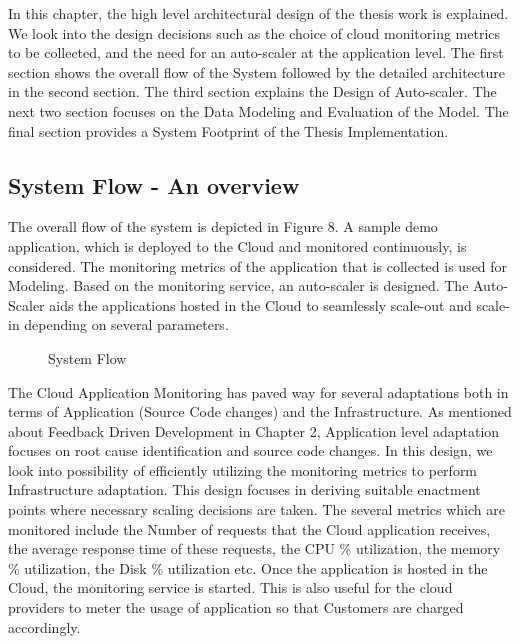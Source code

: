 \documentclass[article,type=msc,colorback,12pt,accentcolor=tud7b,table]{tudthesis}
\begin{document}
	In this chapter, the high level architectural design of the thesis work is explained. We look into the design decisions such as the choice of cloud monitoring metrics to be collected, and the need for an auto-scaler at the application level. The first section shows the overall flow of the System followed by the detailed architecture in the second section. The third section explains the Design of Auto-scaler. The next two section focuses on the Data Modeling and Evaluation of the Model. The final section provides a System Footprint of the Thesis Implementation.
 
\subsection{System Flow - An overview} 

	The overall flow of the system is depicted in Figure 8. A sample demo application, which is deployed to the Cloud and monitored continuously, is considered. The monitoring metrics of the application that is collected is used for Modeling. Based on the monitoring service, an auto-scaler is designed. The Auto-Scaler aids the applications hosted in the Cloud to seamlessly scale-out and scale-in depending on several parameters. 
	
		 \begin{figure}[!h]
		 	\begin{center}
		 		\makebox[\textwidth]{\texttt{[image: C1]}}
		 	\end{center}
		 	\caption{System Flow}
		 \end{figure}
		 
	
	The Cloud Application Monitoring has paved way for several adaptations both in terms of Application (Source Code changes) and the Infrastructure. As mentioned about Feedback Driven Development in Chapter 2, Application level adaptation focuses on root cause identification and source code changes. In this design, we look into possibility of efficiently utilizing the monitoring metrics to perform Infrastructure adaptation.  This design focuses in deriving suitable enactment points where necessary scaling decisions are taken. The several metrics which are monitored include the Number of requests that the Cloud application receives, the average response time of these requests, the CPU \% utilization, the memory \% utilization, the Disk \% utilization etc. Once the application is hosted in the Cloud, the monitoring service is started. This is also useful for the cloud providers to meter the usage of application so that Customers are charged accordingly.
 
\end{document}
